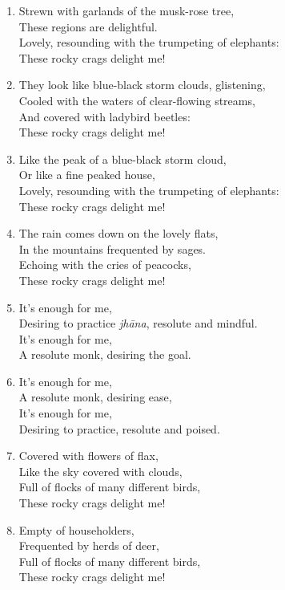 \documentclass[10pt, openany]{book}
\begin{document}
\begin{enumerate}
\item Strewn with garlands of the musk-rose tree,\\
These regions are delightful.\\
Lovely, resounding with the trumpeting of elephants:\\
These rocky crags delight me!

\item They look like blue-black storm clouds, glistening, \\
Cooled with the waters of clear-flowing streams,\\
And covered with ladybird beetles:\\
These rocky crags delight me!

\item Like the peak of a blue-black storm cloud,\\
Or like a fine peaked house,\\
Lovely, resounding with the trumpeting of elephants:\\
These rocky crags delight me!

\item The rain comes down on the lovely flats,\\
In the mountains frequented by sages.\\
Echoing with the cries of peacocks,\\
These rocky crags delight me!

\item It’s enough for me,\\
Desiring to practice \emph{jhāna}, resolute and mindful.\\
It’s enough for me,\\
A resolute monk, desiring the goal.

\item It’s enough for me,\\
A resolute monk, desiring ease,\\
It’s enough for me,\\
Desiring to practice, resolute and poised.

\item Covered with flowers of flax,\\
Like the sky covered with clouds,\\
Full of flocks of many different birds,\\
These rocky crags delight me!

\item Empty of householders,\\
Frequented by herds of deer,\\
Full of flocks of many different birds,\\
These rocky crags delight me!


\end{enumerate}
\end{document}
